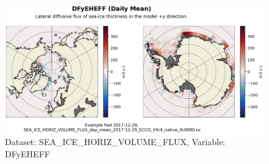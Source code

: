 \begin{figure}[H]
\centering
\includegraphics[scale=0.55]{../images/plots/native_plots/Sea-Ice_and_Snow_Horizontal_Volume_Fluxes/DFyEHEFF.png}
\caption{Dataset: SEA\_ICE\_HORIZ\_VOLUME\_FLUX, Variable: DFyEHEFF}
\label{tab:table-SEA_ICE_HORIZ_VOLUME_FLUX_DFyEHEFF-Plot}
\end{figure}
\pagebreak
